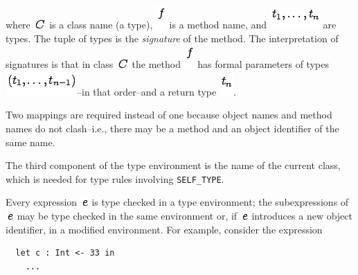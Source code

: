 \documentclass[]{article}
\begin{document}
where \includegraphics{img61.png} is a class name (a type),
\includegraphics{img62.png} is a method name, and
\includegraphics{img63.png} are types. The tuple of types is the
\emph{signature} of the method. The interpretation of signatures is that
in class \includegraphics{img61.png} the method
\includegraphics{img62.png} has formal parameters of types
\includegraphics{img64.png}--in that order--and a return type
\includegraphics{img65.png}.

Two mappings are required instead of one because object names and method
names do not clash--i.e., there may be a method and an object identifier
of the same name.

The third component of the type environment is the name of the current
class, which is needed for type rules involving \texttt{SELF\_TYPE}.

Every expression \includegraphics{img51.png} is type checked in a type
environment; the subexpressions of \includegraphics{img51.png} may be
type checked in the same environment or, if \includegraphics{img51.png}
introduces a new object identifier, in a modified environment. For
example, consider the expression

\begin{verbatim}
  let c : Int <- 33 in
    ...
\end{verbatim}
\end{document}
